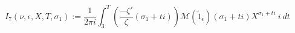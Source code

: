 \begin{definition}[I₇]
\label{I7}
\leanok
$$
  I_7(\nu, \epsilon, X, T, \sigma_1) := \frac{1}{2\pi i} \int_{3}^{T}
  \left(
  \frac{-\zeta'}\zeta(\sigma_1 + t i)
  \right)
    \mathcal M(\widetilde 1_\epsilon)(\sigma_1 + t i)
  X^{\sigma_1 + t i} \ i \ dt
  $$
\end{definition}

